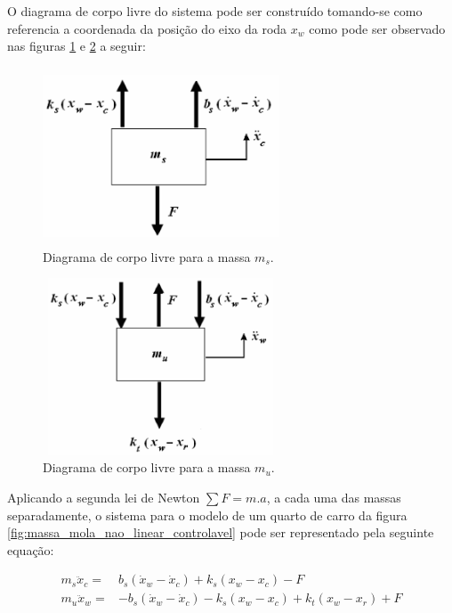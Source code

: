 O diagrama de corpo livre do sistema pode ser construído tomando-se como referencia a coordenada da posição do eixo da roda $x_w$ como pode ser observado nas figuras \ref{fig:corpo_livre_ms} e \ref{fig:corpo_livre_mu} a seguir:
\FloatBarrier
\begin{figure}[htbp]
        \begin{centering}
            \includegraphics[width=7cm,height=5.25cm]{img/corpo_livre_ms.png}
            \caption{Diagrama de corpo livre para a massa $m_s$.} 
            \label{fig:corpo_livre_ms}
        \end{centering}
\end{figure}
\FloatBarrier
\begin{figure}[htbp]
    \begin{centering}
        \includegraphics[width=7cm,height=5.25cm]{img/corpo_livre_mu.png}
        \caption{Diagrama de corpo livre para a massa $m_u$.} 
        \label{fig:corpo_livre_mu}
    \end{centering}
\end{figure}
\FloatBarrier
    
Aplicando a segunda lei de Newton $\sum{F}=m.a$, a cada uma das massas separadamente, o sistema para o modelo de um quarto de carro da figura \ref{fig:massa_mola_nao_linear_controlavel} pode ser representado pela seguinte equação:
    
\begin{equation} \label{eq:massa_mola_linear}
    \begin{split}
        m_{s} \ddot{x}_{c} =&  b_{s}(\dot{x}_{w}-\dot{x}_{c}) + k_{s}(x_{w}-x_{c}) - F\ \\
        m_{u} \ddot{x}_{w} =& -b_{s}(\dot{x}_{w}-\dot{x}_{c}) - k_{s}(x_{w}-x_{c})+k_{t}(x_{w}-x_{r}) + F
    \end{split}
\end{equation}
    
